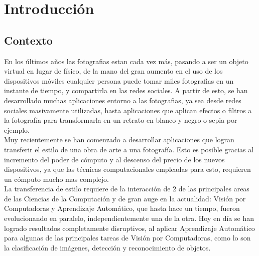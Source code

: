 \documentclass[a4paper,11pt,spanish]{book}
\begin{document}
\tableofcontents

\chapter{Introducción}
  \section {Contexto}
    En los últimos años las fotografias estan cada vez más, pasando a ser un objeto virtual en lugar de físico, de la mano del gran aumento en el uso de los dispositivos móviles
    cualquier persona puede tomar miles fotografias en un instante de tiempo, y compartirla en las redes sociales.
    A partir de esto, se han desarrollado muchas aplicaciones entorno a las fotografias, ya sea desde redes sociales masivamente utilizadas, hasta aplicaciones que aplican efectos o filtros
    a la fotografía para transformarla en un retrato en blanco y negro o sepia por ejemplo. \\
    Muy recientemente se han comenzado a desarrollar aplicaciones que logran transferir el estilo de una obra de arte a una fotografía. Esto es posible gracias al incremento
    del poder de cómputo y al descenso del precio de los nuevos dispositivos, ya que las técnicas computacionales empleadas para esto, requieren un cómputo mucho mas complejo.\\
    La transferencia de estilo requiere de la interacción de 2 de las principales areas de las Ciencias de la Computación y de gran auge en la actualidad: Visión por Computadoras y Aprendizaje Automático,
    que hasta hace un tiempo, fueron evolucionando en paralelo, independientemente una de la otra. Hoy en día se han logrado resultados completamente disruptivos, al aplicar
    Aprendizaje Automático para algunas de las principales tareas de Visión por Computadoras, como lo son la clasificación de imágenes, detección y reconocimiento de objetos.\\
\end{document}

